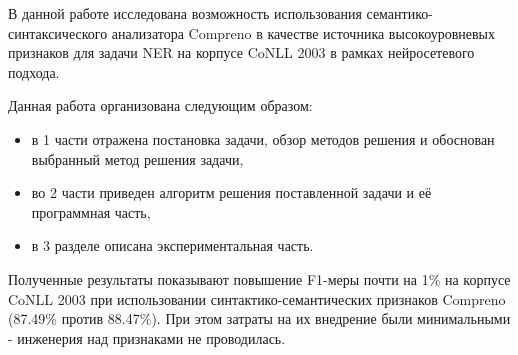   В данной работе исследована возможность использования семантико-синтаксического
  анализатора Compreno в качестве источника высокоуровневых признаков для задачи
  NER на корпусе CoNLL 2003 в рамках нейросетевого подхода.

  Данная работа организована следующим образом:
  \begin{itemize}
    \item в 1 части отражена постановка задачи, обзор методов решения и обоснован выбранный метод решения задачи,
    \item во 2 части приведен алгоритм решения поставленной задачи и её программная часть,
    \item в 3 разделе описана экспериментальная часть.
  \end{itemize}

  Полученные результаты показывают повышение F1-меры почти на 1\% на корпусе CoNLL 2003
  при использовании синтактико-семантических признаков Compreno (87.49\% против 88.47\%).
  При этом затраты на их внедрение были минимальными - инженерия над признаками не проводилась.
